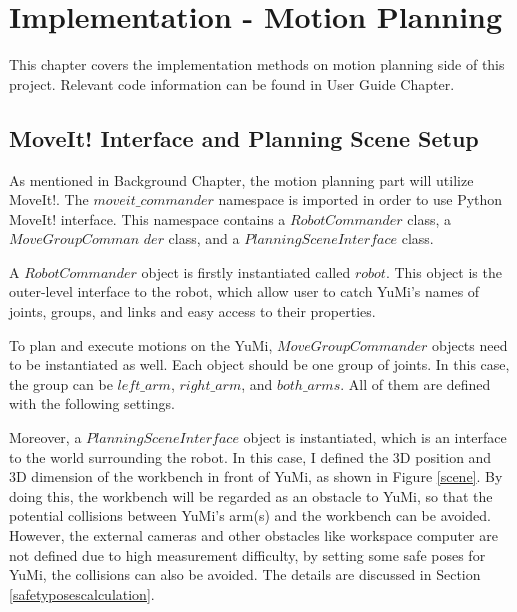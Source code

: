\chapter{Implementation - Motion Planning}

This chapter covers the implementation methods on motion planning side of this project. Relevant code information can be found in User Guide Chapter.

\section{MoveIt! Interface and Planning Scene Setup} \label{motionplansetup}
As mentioned in Background Chapter, the motion planning part will utilize MoveIt!. The $moveit\_commander$ namespace is imported in order to use Python MoveIt! interface. This namespace contains a $RobotCommander$ class, a $MoveGroupComman$ $der$ class, and a $PlanningSceneInterface$ class.

A $RobotCommander$ object is firstly instantiated called $robot$. This object is the outer-level interface to the robot, which allow user to catch YuMi's names of joints, groups, and links and easy access to their properties.

To plan and execute motions on the YuMi, $MoveGroupCommander$ objects need to be instantiated as well. Each object should be one group of joints. In this case, the group can be $left\_arm$, $right\_arm$, and $both\_arms$. All of them are defined with the following settings.

\begin{table}[H]
\centering
{}
\caption{Settings of three $MoveGroupCommander$ objects: $left\_arm$, $right\_$ $arm$, and $both\_arms$}
\label{armsetup}
\end{table}

Moreover, a $PlanningSceneInterface$ object is instantiated, which is an interface to the world surrounding the robot. In this case, I defined the 3D position and 3D dimension of the workbench in front of YuMi, as shown in Figure \ref{scene}. By doing this, the workbench will be regarded as an obstacle to YuMi, so that the potential collisions between YuMi's arm(s) and the workbench can be avoided. However, the external cameras and other obstacles like workspace computer are not defined due to high measurement difficulty, by setting some safe poses for YuMi, the collisions can also be avoided. The details are discussed in Section \ref{safetyposescalculation}.

